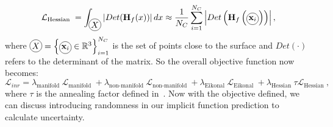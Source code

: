\begin{equation}\label{Hessian}
    \mathcal{L}_{\text{Hessian }} = \int_{\circled{$X$}} \left|Det(\mathbf{H}_f(x))\right| d x \approx \frac{1}{N_C}\sum_{i=1}^{N_C} \left|Det\left(\mathbf{H}_f\left(\circled{$\mathbf{x}_i$}\right)\right)\right|,
\end{equation}
where $\circled{$X$}=\left\{\circled{$\mathbf{x}_i$} \in \mathbb{R}^{3}\right\}_{i=1}^{N_C}$ is the set of points close to the surface and $Det(\cdot)$ refers to the determinant of the matrix. So the overall objective function now becomes:
\begin{equation}
    \mathcal{L}_{inr}= \lambda_{\text {manifold }} \mathcal{L}_{\text {manifold }}+\lambda_{\text {non-manifold }} \mathcal{L}_{\text {non-manifold }}+ \lambda_{\text {Eikonal }} \mathcal{L}_{\text {Eikonal }}+ \lambda_{\text{Hessian }} \tau \mathcal{L}_{\text{Hessian }},
\end{equation}
where $\tau$ is the annealing factor defined in~\cite{NeuralHessian}. Now with the objective defined, we can discuss introducing randomness in our implicit function prediction to calculate uncertainty.


